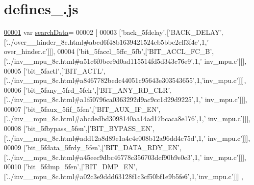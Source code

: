 \hypertarget{defines__1_8js_source}{}\section{defines\+\_.\+js}
\label{defines__1_8js_source}

\begin{DoxyCode}
\hypertarget{defines__1_8js_source.tex_l00001}{}\hyperlink{defines__1_8js_ad01a7523f103d6242ef9b0451861231e}{00001} var \hyperlink{defines__1_8js_ad01a7523f103d6242ef9b0451861231e}{searchData}=
00002 [
00003   [\textcolor{stringliteral}{'back\_5fdelay'},[\textcolor{stringliteral}{'BACK\_DELAY'},[\textcolor{stringliteral}{'../over\_\_hinder\_8c.html#abcd6f48b1639421524eb5bbe2cff3f4e'},1,\textcolor{stringliteral}{'
      over\_hinder.c'}]]],
00004   [\textcolor{stringliteral}{'bit\_5faccl\_5ffc\_5fb'},[\textcolor{stringliteral}{'BIT\_ACCL\_FC\_B'},[\textcolor{stringliteral}{'../inv\_\_mpu\_8c.html#a51c6f0bce9d0ad115514fd5d343c76e9'},1,\textcolor{stringliteral}{'
      inv\_mpu.c'}]]],
00005   [\textcolor{stringliteral}{'bit\_5factl'},[\textcolor{stringliteral}{'BIT\_ACTL'},[\textcolor{stringliteral}{'../inv\_\_mpu\_8c.html#a8467782bedc44051c95643e303543655'},1,\textcolor{stringliteral}{'inv\_mpu.c'}]]],
00006   [\textcolor{stringliteral}{'bit\_5fany\_5frd\_5fclr'},[\textcolor{stringliteral}{'BIT\_ANY\_RD\_CLR'},[\textcolor{stringliteral}{'../inv\_\_mpu\_8c.html#a1f50796ca0363292d9ac9cc1d29d9225'},1,\textcolor{stringliteral}{'
      inv\_mpu.c'}]]],
00007   [\textcolor{stringliteral}{'bit\_5faux\_5fif\_5fen'},[\textcolor{stringliteral}{'BIT\_AUX\_IF\_EN'},[\textcolor{stringliteral}{'../inv\_\_mpu\_8c.html#abcdedbd3098140aa14ad17bcaca8e176'},1,\textcolor{stringliteral}{'
      inv\_mpu.c'}]]],
00008   [\textcolor{stringliteral}{'bit\_5fbypass\_5fen'},[\textcolor{stringliteral}{'BIT\_BYPASS\_EN'},[\textcolor{stringliteral}{'../inv\_\_mpu\_8c.html#add12a8d89e1a4c4e008b12a96dd4c75d'},1,\textcolor{stringliteral}{'
      inv\_mpu.c'}]]],
00009   [\textcolor{stringliteral}{'bit\_5fdata\_5frdy\_5fen'},[\textcolor{stringliteral}{'BIT\_DATA\_RDY\_EN'},[\textcolor{stringliteral}{'../inv\_\_mpu\_8c.html#a45eec9dbc46778c356703dcf90b9e0c3'},1,\textcolor{stringliteral}{'
      inv\_mpu.c'}]]],
00010   [\textcolor{stringliteral}{'bit\_5fdmp\_5fen'},[\textcolor{stringliteral}{'BIT\_DMP\_EN'},[\textcolor{stringliteral}{'../inv\_\_mpu\_8c.html#a02c3e9ddd63128f1c3cf50bf1e9b5fe6'},1,\textcolor{stringliteral}{'inv\_mpu.c'}]]]
      ,

\end{DoxyCode}

